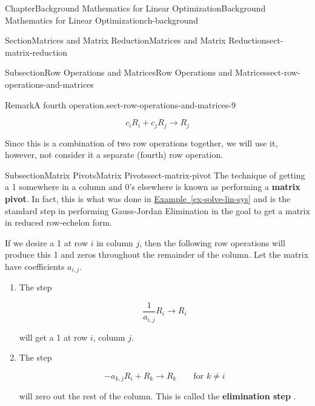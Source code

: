 \documentclass[oneside,10pt,]{book}
\newcommand{\xreffont}{\relax}
\newcommand{\terminology}[1]{\textbf{#1}}
\numberwithin{equation}{section}
\begin{document}
\begin{chapterptx}{Chapter}{Background Mathematics for Linear Optimization}{}{Background Mathematics for Linear Optimization}{}{}{ch-background}
\begin{sectionptx}{Section}{Matrices and Matrix Reduction}{}{Matrices and Matrix Reduction}{}{}{sect-matrix-reduction}
\begin{subsectionptx}{Subsection}{Row Operations and Matrices}{}{Row Operations and Matrices}{}{}{sect-row-operations-and-matrices}
\begin{remark}{Remark}{A fourth operation.}{sect-row-operations-and-matrices-9}
\par
%
\begin{equation*}
c_i R_i + c_j R_j \rightarrow R_j
\end{equation*}
%
\par
Since this is a combination of two row operations together, we will use it, however, not consider it a separate (fourth) row operation.%
\end{remark}
\end{subsectionptx}
%
%
\typeout{************************************************}
\typeout{************************************************}
%
\begin{subsectionptx}{Subsection}{Matrix Pivots}{}{Matrix Pivots}{}{}{sect-matrix-pivot}
The technique of getting a 1 somewhere in a column and 0's elsewhere is known as performing a \terminology{matrix pivot}. In fact, this is what was done in \hyperref[ex-solve-lin-sys]{Example~{\xreffont\ref{ex-solve-lin-sys}}} and is the standard step in performing Gauss-Jordan Elimination in the goal to get a matrix in reduced row-echelon form.%
\par
If we desire a 1 at row \(i\) in column \(j\), then the following row operations will produce this 1 and zeros throughout the remainder of the column. Let the matrix have coefficients \(a_{i,j}\).%
\par
%
\begin{enumerate}
\item{}The step%
\par
%
\begin{equation*}
\frac{1}{a_{i,j}} R_i \to R_i
\end{equation*}
%
\par
will get a 1 at row \(i\), column \(j\).%
\item{}The step%
\par
%
\begin{equation*}
- a_{k,j} R_i + R_k \to R_k \qquad \text{for $k \neq i$}
\end{equation*}
%
\par
will zero out the rest of the column. This is called the \terminology{elimination step} .%
\end{enumerate}
%
\par

\end{subsectionptx}
\end{sectionptx}
\end{chapterptx}
\end{document}
